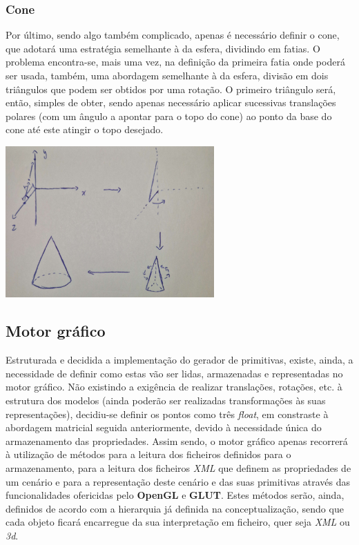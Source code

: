 \subsubsection{Cone}

Por último, sendo algo também complicado, apenas é necessário definir o
cone, que adotará uma estratégia semelhante à da esfera, dividindo em
fatias.\newline
\break
\noindent
O problema encontra-se, mais uma vez, na definição da primeira fatia
onde poderá ser usada, também, uma abordagem semelhante à da esfera,
divisão em dois triângulos que podem ser obtidos por uma rotação.\newline
\break
\noindent
O primeiro triângulo será, então, simples de obter, sendo apenas
necessário aplicar sucessivas translações polares (com um ângulo a 
apontar para o topo do cone) ao ponto da base do cone até este atingir
o topo desejado.\newline
\break

\begin{center}
    \includegraphics[width=0.6\textwidth]{imgs/cone.png}
    \label{fig:cone}
\end{center}

\subsection{Motor gráfico}

Estruturada e decidida a implementação do gerador de primitivas, existe,
ainda, a necessidade de definir como estas vão ser lidas, armazenadas e
representadas no motor gráfico.\newline
\break
\noindent
Não existindo a exigência de realizar translações, rotações, etc. à
estrutura dos modelos (ainda poderão ser realizadas transformações às suas
representações), decidiu-se definir os pontos como três \textit{float},
em constraste à abordagem matricial seguida anteriormente, devido à
necessidade única do armazenamento das propriedades.\newline
\break
\noindent
Assim sendo, o motor gráfico apenas recorrerá à utilização de métodos para
a leitura dos ficheiros definidos para o armazenamento, para a leitura dos
ficheiros \textit{XML} que definem as propriedades de um cenário
e para a representação deste cenário e das suas primitivas
através das funcionalidades ofericidas pelo
\textbf{OpenGL} e \textbf{GLUT}.\newline
\break
\noindent
Estes métodos serão, ainda, definidos de acordo com a hierarquia
já definida na conceptualização, sendo que cada objeto ficará
encarregue da sua interpretação em ficheiro, quer seja \textit{XML}
ou \textit{3d}.
